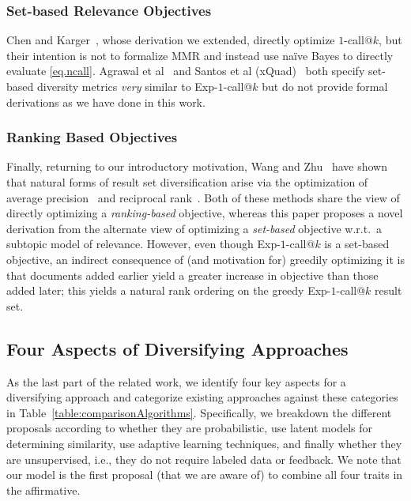 \subsubsection{Set-based Relevance Objectives} 
Chen and Karger~\cite{chen06Less}, whose derivation we extended, directly
optimize $1$-call@$k$, but their intention is not to formalize MMR and
instead use na\"{i}ve Bayes to directly evaluate
\eqref{eq.ncall}.  Agrawal et al~\cite{agrawal09diversifying}
and Santos et al (xQuad)~\cite{santos2010xquad} both specify set-based
diversity metrics \emph{very} similar to Exp-$1$-call@$k$ but do not provide
formal derivations as we have done in this work. 

\subsubsection{Ranking Based Objectives} 
Finally, returning to our introductory motivation, Wang and Zhu~\cite{wangzhu10} have shown that
natural forms of result set diversification arise via the optimization
of average precision~\cite{ap} and reciprocal rank~\cite{mrr}.  Both
of these methods share the view of directly optimizing a
\emph{ranking-based} objective, whereas this paper proposes a novel
derivation from the alternate view of optimizing a \emph{set-based}
objective w.r.t.\ a subtopic model of relevance.  However, even though
Exp-$1$-call@$k$ is a set-based objective, an indirect consequence of
(and motivation for) greedily optimizing it is that documents added
earlier yield a greater increase in objective than those added later;
this yields a natural rank ordering on the greedy Exp-$1$-call@$k$
result set.

\subsection{Four Aspects of Diversifying Approaches}
As the last part of the related work, we identify four key aspects for a diversifying approach and categorize existing approaches against these categories in Table~\ref{table:comparisonAlgorithms}. Specifically, we breakdown the
different proposals according to whether they are probabilistic, use
latent models for determining similarity, use adaptive learning
techniques, and finally whether they are unsupervised, i.e., they do
not require labeled data or feedback. We note that our model is the first
proposal (that we are aware of) to combine all four traits in the
affirmative. 

